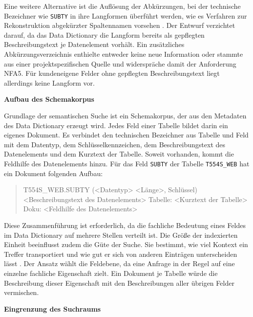Eine weitere Alternative ist die Auflösung der Abkürzungen, bei der technische Bezeichner wie \texttt{SUBTY} in ihre Langformen überführt werden, wie es Verfahren zur Rekonstruktion abgekürzter Spaltennamen vorsehen \cite{cai_columbo_2025}. Der Entwurf verzichtet darauf, da das Data Dictionary die Langform bereits als gepflegten Beschreibungstext je Datenelement vorhält. Ein zusätzliches Abkürzungsverzeichnis enthielte entweder keine neue Information oder stammte aus einer projektspezifischen Quelle und widerspräche damit der Anforderung NFA5. Für kundeneigene Felder ohne gepflegten Beschreibungstext liegt allerdings keine Langform vor.

\textbf{Aufbau des Schemakorpus}

Grundlage der semantischen Suche ist ein Schemakorpus, der aus den Metadaten des Data Dictionary erzeugt wird. Jedes Feld einer Tabelle bildet darin ein eigenes Dokument. Es verbindet den technischen Bezeichner aus Tabelle und Feld mit dem Datentyp, dem Schlüsselkennzeichen, dem Beschreibungstext des Datenelements und dem Kurztext der Tabelle. Soweit vorhanden, kommt die Feldhilfe des Datenelements hinzu. Für das Feld \texttt{SUBTY} der Tabelle \texttt{T554S\_WEB} hat ein Dokument folgenden Aufbau:
\begin{quote}\ttfamily
T554S\_WEB.SUBTY (\textless Datentyp\textgreater{} \textless Länge\textgreater, Schlüssel) \textbar{} \textless Beschreibungstext des Datenelements\textgreater{} \textbar{} Tabelle: \textless Kurztext der Tabelle\textgreater{} \textbar{} Doku: \textless Feldhilfe des Datenelements\textgreater
\end{quote}
Diese Zusammenführung ist erforderlich, da die fachliche Bedeutung eines Feldes im Data Dictionary auf mehrere Stellen verteilt ist. Die Größe der indexierten Einheit beeinflusst zudem die Güte der Suche. Sie bestimmt, wie viel Kontext ein Treffer transportiert und wie gut er sich von anderen Einträgen unterscheiden lässt \cite{chen_dense_2024}. Der Ansatz wählt die Feldebene, da eine Anfrage in der Regel auf eine einzelne fachliche Eigenschaft zielt. Ein Dokument je Tabelle würde die Beschreibung dieser Eigenschaft mit den Beschreibungen aller übrigen Felder vermischen.

\textbf{Eingrenzung des Suchraums}

